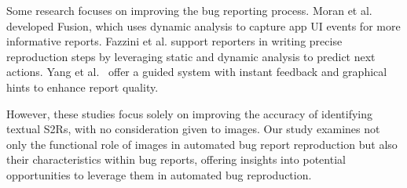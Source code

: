 Some research focuses on improving the bug reporting process. Moran et al.\cite{moran2015auto} developed Fusion, which uses dynamic analysis to capture app UI events for more informative reports. Fazzini et al.\cite{fazzini2022enhancing} support reporters in writing precise reproduction steps by leveraging static and dynamic analysis to predict next actions. Yang et al.~\cite{song2022toward} offer a guided system with instant feedback and graphical hints to enhance report quality. %

However, these studies focus solely on improving the accuracy of identifying textual S2Rs, with no consideration given to images. Our study examines not only the functional role of images in automated bug report reproduction but also their characteristics within bug reports, offering insights into  potential opportunities to leverage them in automated bug reproduction.